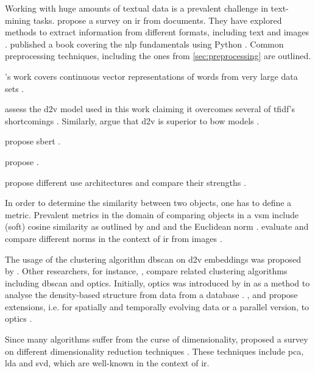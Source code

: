 

Working with huge amounts of textual data is a prevalent challenge in text-mining tasks.
\citeauthor{InformationRetrieval1999} propose a survey on \ac{ir} from documents.
They have explored methods to extract information from different formats, including text and images \cite{InformationRetrieval1999}.
\citeauthor{nlp-book2009} published a book covering the \ac{nlp} fundamentals using Python \cite{nlp-book2009}.
Common preprocessing techniques, including the ones from \autoref{sec:preprocessing} are outlined. 

\citeauthor{WordRep2013}'s work covers continuous vector representations of words from very large data sets \cite{WordRep2013}.


\citeauthor{clusteringDocs2020} assess the \ac{d2v} model used in this work claiming it overcomes several of \ac{tfidf}'s shortcomings \cite{clusteringDocs2020}.
Similarly, \citeauthor{SentRep2014} argue that \ac{d2v} is superior to \ac{bow} models \cite{SentRep2014}.

\citeauthor{HfsentTrans2019} propose \ac{sbert} \cite{HfsentTrans2019}.

\citeauthor{inferSent2018} propose \infersent{} \cite{inferSent2018}.

\citeauthor{UniversalSentEnc2018} propose different \ac{use} architectures and compare their strengths \cite{UniversalSentEnc2018}.


In order to determine the similarity between two objects, one has to define a metric.
Prevalent metrics in the domain of comparing objects in a \ac{vsm} include (soft) cosine similarity 
as outlined by \citeauthor{soft_cosine2014} and \citeauthor{soft_cosine2017} \cite{soft_cosine2014, soft_cosine2017}
and the Euclidean norm \cite{euclidean_l2_norm2015}.
\citeauthor{euclidean_l2_norm2015} evaluate and compare different norms in the context of \ac{ir} from images \cite{euclidean_l2_norm2015}.



The usage of the clustering algorithm \ac{dbscan} on \ac{d2v} embeddings was proposed by \citeauthor{clusteringDocs2020} \cite{clusteringDocs2020}.
Other researchers, for instance, \citeauthor{OPTICS_kMeans_2016}, compare related clustering algorithms including \ac{dbscan} and \ac{optics}.
Initially, \ac{optics} was introduced by \citeauthor{OPTICS1999} in \citeyear{OPTICS1999} as a method to analyse the density-based structure from data from a database \cite{OPTICS1999}.
\citeauthor{OPTICS2013}, \citeauthor{OPTICS2014} and \citeauthor{OPTICS2016} propose extensions, 
i.e. for spatially and temporally evolving data or a parallel version, to \ac{optics} \cite{OPTICS2013, OPTICS2014, OPTICS2016}.

Since many algorithms suffer from the curse of dimensionality, \citeauthor{dim_reduction2021} proposed a survey on different dimensionality reduction techniques \cite{dim_reduction2021}.
These techniques include \ac{pca}, \ac{lda} and \ac{svd}, which are well-known in the context of \ac{ir}.